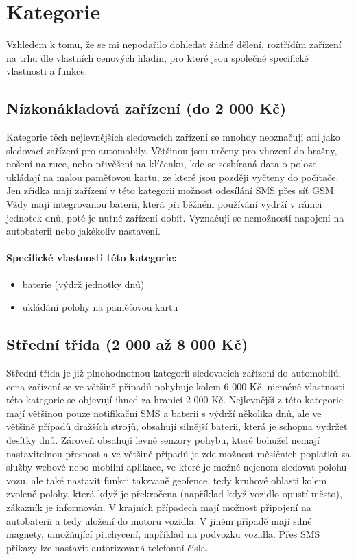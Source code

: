 \documentclass[FM,MP]{tulthesis}  %
\begin{document}
\section{Kategorie}
Vzhledem k tomu, že se mi nepodařilo dohledat žádné dělení, roztřídím zařízení na trhu dle vlastních cenových hladin, pro které jsou společné specifické vlastnosti a funkce.

\subsection{Nízkonákladová zařízení (do 2 000 Kč)}
Kategorie těch nejlevnějších sledovacích zařízení se mnohdy neoznačují ani jako sledovací zařízení pro automobily. Většinou jsou určeny pro vhození do brašny, nošení na ruce, nebo přivěšení na klíčenku, kde se sesbíraná data o poloze ukládají na malou paměťovou kartu, ze které jsou později vyčteny do počítače. Jen zřídka mají zařízení v této kategorii možnost odesílání SMS přes síť GSM. Vždy mají integrovanou baterii, která při běžném používání vydrží v rámci jednotek dnů, poté je nutné zařízení dobít. Vyznačují se nemožností napojení na autobaterii nebo jakékoliv nastavení.

\paragraph{Specifické vlastnosti této kategorie:}
\begin{itemize}
\item baterie (výdrž jednotky dnů)
\item ukládání polohy na paměťovou kartu
\end{itemize}

\subsection{Střední třída (2 000 až 8 000 Kč)}
Střední třída je již plnohodnotnou kategorií sledovacích zařízení do automobilů, cena zařízení se ve většině případů pohybuje kolem 6 000 Kč, nicméně vlastnosti této kategorie se objevují ihned za hranicí 2 000 Kč. Nejlevnější z této kategorie mají většinou pouze notifikační SMS a baterii s výdrží několika dnů, ale ve většině případů dražších strojů, obsahují silnější baterii, která je schopna vydržet desítky dnů. Zároveň obsahují levné senzory pohybu, které bohužel nemají nastavitelnou přesnost a ve většině případů je zde možnost měsíčních poplatků za služby webové nebo mobilní aplikace, ve které je možné nejenom sledovat polohu vozu, ale také nastavit funkci takzvaně geofence, tedy kruhové oblasti kolem zvolené polohy, která když je překročena (například když vozidlo opustí město), zákazník je informován. V krajních případech mají možnost připojení na autobaterii a tedy uložení do motoru vozidla. V jiném případě mají silné magnety, umožňující přichycení, například na podvozku vozidla. Přes SMS příkazy lze nastavit autorizovaná telefonní čísla.
\end{document}
